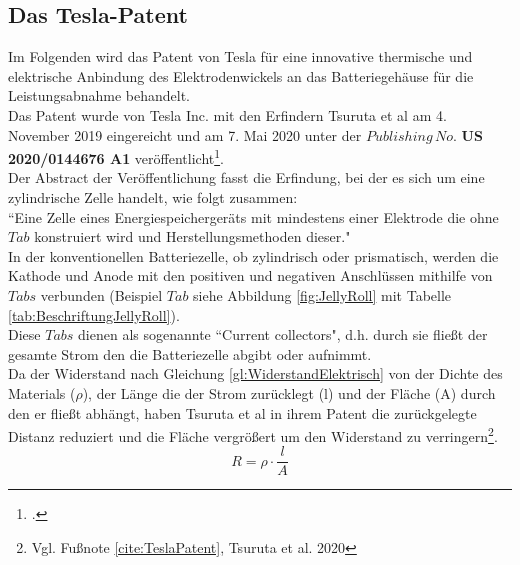 \subsection{Das Tesla-Patent}

Im Folgenden wird das Patent von Tesla für eine innovative thermische und elektrische Anbindung des Elektrodenwickels an das Batteriegehäuse für die Leistungsabnahme behandelt.\\
Das Patent wurde von Tesla Inc. mit den Erfindern Tsuruta et al am 4. November 2019 eingereicht und am 7. Mai 2020 unter der $Publishing\,No.$ \textbf{US 2020/0144676 A1} veröffentlicht\footcite[Vgl.\label{cite:TeslaPatent}][]{TsurutaTesla2020}.\\
Der Abstract der Veröffentlichung fasst die Erfindung, bei der es sich um eine zylindrische Zelle handelt, wie folgt zusammen: \\
``Eine Zelle eines Energiespeichergeräts mit mindestens einer Elektrode die ohne $Tab$ konstruiert wird und Herstellungsmethoden dieser."\\

In der konventionellen Batteriezelle, ob zylindrisch oder prismatisch, werden die Kathode und Anode mit den positiven und negativen Anschlüssen mithilfe von $Tabs$ verbunden (Beispiel $Tab$ siehe Abbildung \ref{fig:JellyRoll} mit Tabelle \ref{tab:BeschriftungJellyRoll}). \\
Diese $Tabs$ dienen als sogenannte ``Current collectors", d.h. durch sie fließt der gesamte Strom den die Batteriezelle abgibt oder aufnimmt. \\
Da der Widerstand nach Gleichung \ref{gl:WiderstandElektrisch} von der Dichte des Materials ($\rho$), der Länge die der Strom zurücklegt (l) und der Fläche (A) durch den er fließt abhängt, haben Tsuruta et al in ihrem Patent die zurückgelegte Distanz reduziert und die Fläche vergrößert um den Widerstand zu verringern\footnote{Vgl. Fußnote \ref{cite:TeslaPatent}, Tsuruta et al. 2020}.
\begin{equation}
	R = \rho \cdot \frac{l}{A}
	\label{gl:WiderstandElektrisch}
\end{equation}

